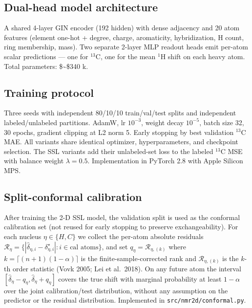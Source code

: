 \documentclass[11pt,a4paper]{article}
\begin{document}
\subsection{Dual-head model architecture}\label{dual-head-model-architecture}

A shared 4-layer GIN encoder (192 hidden) with dense adjacency and 20 atom features (element one-hot + degree, charge, aromaticity, hybridization, H count, ring membership, mass). Two separate 2-layer MLP readout heads emit per-atom scalar predictions --- one for \(^{13}\)C, one for the mean \(^{1}\)H shift on each heavy atom. Total parameters: \$\sim\$340 k.

\subsection{Training protocol}\label{training-protocol}

Three seeds with independent 80/10/10 train/val/test splits and independent labeled/unlabeled partitions. AdamW, lr \(10^{-3}\), weight decay \(10^{-5}\), batch size 32, 30 epochs, gradient clipping at L2 norm 5. Early stopping by best validation \(^{13}\)C MAE. All variants share identical optimizer, hyperparameters, and checkpoint selection. The SSL variants add their unlabeled-set loss to the labeled \(^{13}\)C MSE with balance weight \(\lambda = 0.5\). Implementation in PyTorch 2.8 with Apple Silicon MPS.

\subsection{Split-conformal calibration}\label{split-conformal-calibration}

After training the 2-D SSL model, the validation split is used as the conformal calibration set (not reused for early stopping to preserve exchangeability). For each nucleus \(\eta \in \{H, C\}\) we collect the per-atom absolute residuals \(\mathcal{R}_\eta = \{|\hat{\delta}_{\eta,i} - \delta^\star_{\eta,i}| : i \in \text{cal atoms}\}\), and set \(q_\eta = \mathcal{R}_{\eta,(k)}\) where \(k = \lceil (n+1)(1-\alpha) \rceil\) is the finite-sample-corrected rank and \(\mathcal{R}_{\eta,(k)}\) is the \(k\)-th order statistic (Vovk 2005; Lei et al.~2018). On any future atom the interval \([\hat{\delta}_\eta - q_\eta, \hat{\delta}_\eta + q_\eta]\) covers the true shift with marginal probability at least \(1 - \alpha\) over the joint calibration/test distribution, without any assumption on the predictor or the residual distribution. Implemented in \texttt{src/nmr2d/conformal.py}.
\end{document}
